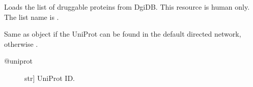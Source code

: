 \documentclass[letterpaper,10pt,english]{sphinxmanual}
\begin{document}
\begin{fulllineitems}
\begin{fulllineitems}
\begin{description}
\end{description}

\end{fulllineitems}


\begin{fulllineitems}
\label{\detokenize{reference:pypath.main.PyPath.dproteins}}
\end{fulllineitems}


\begin{fulllineitems}
\label{\detokenize{reference:pypath.main.PyPath.dps}}
\end{fulllineitems}


\begin{fulllineitems}
\label{\detokenize{reference:pypath.main.PyPath.druggability_list}}
Loads the list of druggable proteins from DgiDB. This resource
is human only.
The list name is .

\end{fulllineitems}


\begin{fulllineitems}
\label{\detokenize{reference:pypath.main.PyPath.duniprot}}
Same as  object if the UniProt
can be found in the default directed network,
otherwise .
\begin{description}
\item[{@uniprot}] \leavevmode{[}str{]}
UniProt ID.

\end{description}


\end{fulllineitems}
\end{fulllineitems}
\end{document}
